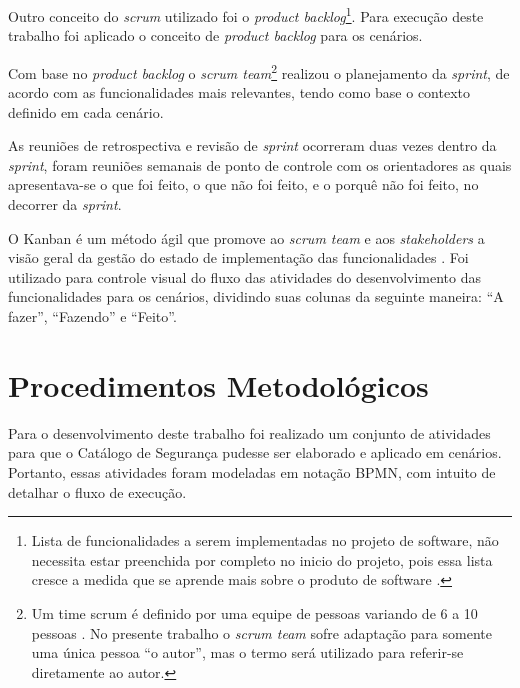 Outro conceito do \textit{scrum} utilizado foi o \textit{product backlog}\footnote[2]{Lista de funcionalidades a serem implementadas no projeto de software, não necessita estar preenchida por completo no inicio do projeto, pois essa lista cresce a medida que se aprende mais sobre o produto de software \cite{schwaber2002agile}.}. Para execução deste trabalho foi aplicado o conceito de \textit{product backlog} para os cenários.

Com base no \textit{product backlog} o \textit{scrum team}\footnote[3]{Um time scrum é definido por uma equipe de pessoas variando de 6 a 10 pessoas \cite{schwaber2002agile}. No presente trabalho o \textit{scrum team} sofre adaptação para somente uma única pessoa “o autor”, mas o termo será utilizado para referir-se diretamente ao autor.} realizou o planejamento da \textit{sprint}, de acordo com as funcionalidades mais relevantes, tendo como base o contexto definido em cada cenário. 

As reuniões de retrospectiva e revisão de \textit{sprint} ocorreram duas vezes dentro da \textit{sprint}, foram reuniões semanais de ponto de controle com os orientadores as quais apresentava-se o que foi feito, o que não foi feito, e o porquê não foi feito, no decorrer da \textit{sprint}. 

O Kanban é um método ágil que promove ao \textit{scrum team} e aos \textit{stakeholders} a visão geral da gestão do estado de implementação das funcionalidades \cite{prikladnicki2014metodos}. Foi utilizado para controle visual do fluxo das atividades do desenvolvimento das funcionalidades para os cenários, dividindo suas colunas da seguinte maneira: “A fazer”, “Fazendo” e “Feito”.

\pagebreak

\section{Procedimentos Metodológicos}
\label{sec:procedimentosMetodológicos}

Para o desenvolvimento deste trabalho foi realizado um conjunto de atividades para que o Catálogo de Segurança pudesse ser elaborado e aplicado em cenários. Portanto, essas atividades foram modeladas em notação BPMN, com intuito de detalhar o fluxo de execução.

